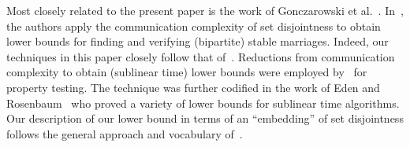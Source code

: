 Most closely related to the present paper is the work of Gonczarowski et al.~\cite{Gonczarowski2019-stable}. In~\cite{Gonczarowski2019-stable}, the authors apply the communication complexity of set disjointness to obtain lower bounds for finding and verifying (bipartite) stable marriages. Indeed, our techniques in this paper closely follow that of~\cite{Gonczarowski2019-stable}. Reductions from communication complexity to obtain (sublinear time) lower bounds were employed by~\cite{Blais2012-property} for property testing. The technique was further codified in the work of Eden and Rosenbaum~\cite{Eden2018-lower} who proved a variety of lower bounds for sublinear time algorithms. Our description of our lower bound in terms of an ``embedding'' of set disjointness follows the general approach and vocabulary of~\cite{Eden2018-lower}.